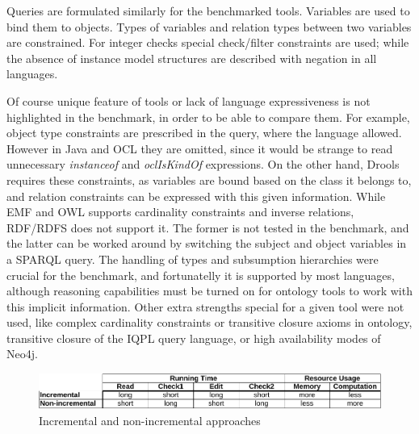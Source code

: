 Queries are formulated similarly for the benchmarked tools. Variables are used
to bind them to objects. Types of variables and relation types between two
variables are constrained. For integer checks special check/filter constraints
are used; while the absence of instance model structures are described with
negation in all languages.


Of course unique feature of tools or lack of language expressiveness is not
highlighted in the benchmark, in order to be able to compare them. For example,
object type constraints are prescribed in the query, where the language allowed.
However in Java and OCL they are omitted, since it would be strange to read
unnecessary \emph{instanceof} and \emph{oclIsKindOf} expressions. On the other
hand, Drools requires these constraints, as variables are bound based on the
class it belongs to, and relation constraints can be expressed with this given
information. While EMF and OWL supports cardinality constraints and inverse
relations, RDF/RDFS does not support it. The former is not tested in the
benchmark, and the latter can be worked around by switching the subject and
object variables in a SPARQL query.
The handling of types and subsumption hierarchies were crucial for the
benchmark, and fortunatelly it is supported by most languages, although
reasoning capabilities must be turned on for ontology tools to work with this
implicit information. Other extra strengths special for a given tool were not
used, like complex cardinality constraints or transitive closure axioms in
ontology, transitive closure of the IQPL query language, or high availability
modes of Neo4j.



\begin{figure}[Hht]
\includegraphics[width=2\columnwidth]{figures/incNonInc.pdf}
\caption{Incremental and non-incremental approaches}
\label{table:incNonInc}
\end{figure}

